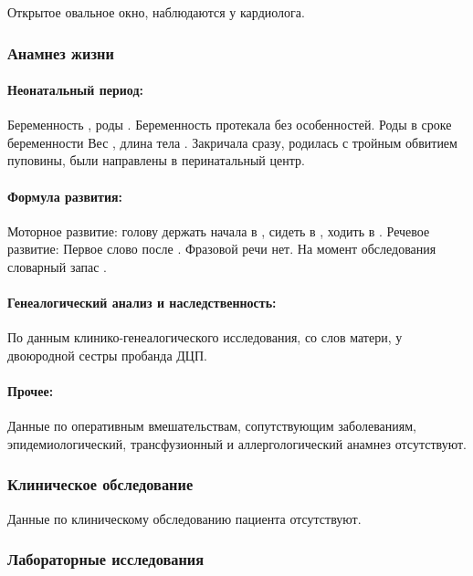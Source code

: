 \documentclass[a4paper,14pt]{extarticle}
\newcommand{\gramm}{г}
\newcommand{\cm}{см}
\newcommand{\months}{мес.}
\newcommand{\weeks}{нед.}
\begin{document}
Открытое овальное окно, наблюдаются у кардиолога.

\subsubsection*{Анамнез жизни}

\paragraph{Неонатальный период:} Беременность , роды .
Беременность протекала без особенностей. Роды в сроке беременности \numprint[\weeks]{41} Вес \numprint[\gramm]{3800}, длина тела \numprint[\cm]{54}. Закричала сразу, родилась с тройным обвитием пуповины, были направлены в перинатальный центр.

\paragraph{Формула развития:} Моторное развитие: голову держать начала в \numprint[\months]{3.5}, сидеть в \numprint[\months]{10}, ходить в .
Речевое развитие: Первое слово после . Фразовой речи нет. На момент обследования словарный запас .

\paragraph{Генеалогический анализ и наследственность:} По данным клинико\hyp{}генеалогического исследования, со слов матери, у двоюродной сестры пробанда ДЦП.

\paragraph{Прочее:} Данные по оперативным вмешательствам, сопутствующим заболеваниям, эпидемиологический, трансфузионный и аллергологический анамнез отсутствуют.

\subsubsection*{Клиническое обследование}

Данные по клиническому обследованию пациента отсутствуют.

\subsubsection*{Лабораторные исследования}
\end{document}
